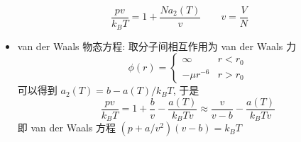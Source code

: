 \documentclass[12pt,a4paper]{article}%
\numberwithin{equation}{section}
\begin{document}
\begin{enumerate}
    \begin{equation}
        \frac{pv}{k_BT} = 1 + \frac{Na_2(T)}{v} \qquad v = \frac VN
    \end{equation}
    \begin{itemize}
        \item van der Waals 物态方程: 取分子间相互作用为 van der Waals 力
        \begin{equation}
            \phi(r) = \begin{cases}
                \infty        &r<r_0 \\
                -\mu r^{-6}   &r>r_0
            \end{cases}
        \end{equation}
        可以得到 $a_2(T) = b-a(T)/k_BT$, 于是
        \begin{equation}
            \frac{pv}{k_BT} = 1+\frac bv - \frac{a(T)}{k_BTv}
            \approx \frac{v}{v-b} - \frac{a(T)}{k_BTv}
        \end{equation}
        即 van der Waals 方程 $(p+a/v^2)(v-b) = k_BT$
    \end{itemize}
\end{enumerate}
\end{document}

